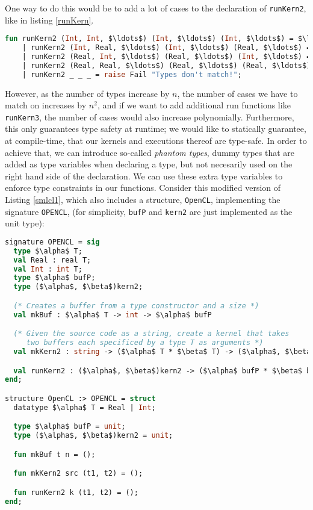 One way to do this would be to add a lot of cases to the declaration
of \texttt{runKern2}, like in listing \ref{runKern}.

\begin{lstlisting}[language=ML, caption=Casing on runKern2,
    label=runKern,mathescape]
  fun runKern2 (Int, Int, $\ldots$) (Int, $\ldots$) (Int, $\ldots$) = $\ldots$
    | runKern2 (Int, Real, $\ldots$) (Int, $\ldots$) (Real, $\ldots$) = $\ldots$
    | runKern2 (Real, Int, $\ldots$) (Real, $\ldots$) (Int, $\ldots$) = $\ldots$
    | runKern2 (Real, Real, $\ldots$) (Real, $\ldots$) (Real, $\ldots$) = $\ldots$
    | runKern2 _ _ _ = raise Fail "Types don't match!";
\end{lstlisting}

However, as the number of types increase by $n$, the number of cases
we have to match on increases by $n^2$, and if we want to add
additional run functions like \texttt{runKern3}, the number of cases
would also increase polynomially. Furthermore, this only guarantees
type safety at runtime; we would like to statically guarantee, at
compile-time, that our kernels and executions thereof are
type-safe. In order to achieve that, we can introduce so-called
\emph{phantom types}, dummy types that are added as type variables
when declaring a type, but not necesarily used on the right hand side
of the declaration. We can use these extra type variables to enforce
type constraints in our functions. Consider this modified version of
Listing \ref{smlcl1}, which also includes a structure,
\texttt{OpenCL}, implementing the signature \texttt{OPENCL}, (for
simplicity, \texttt{bufP} and \texttt{kern2} are just implemented as
the unit type):

\begin{lstlisting}[language=ML, caption=Adding type
    variables,label=smlcl2,mathescape]
signature OPENCL = sig
  type $\alpha$ T;
  val Real : real T;
  val Int : int T;
  type $\alpha$ bufP;
  type ($\alpha$, $\beta$)kern2;

  (* Creates a buffer from a type constructor and a size *)
  val mkBuf : $\alpha$ T -> int -> $\alpha$ bufP

  (* Given the source code as a string, create a kernel that takes
     two buffers each specificed by a type T as arguments *)
  val mkKern2 : string -> ($\alpha$ T * $\beta$ T) -> ($\alpha$, $\beta$)kern2

  val runKern2 : ($\alpha$, $\beta$)kern2 -> ($\alpha$ bufP * $\beta$ bufP) -> unit
end;

structure OpenCL :> OPENCL = struct
  datatype $\alpha$ T = Real | Int;

  type $\alpha$ bufP = unit;
  type ($\alpha$, $\beta$)kern2 = unit;

  fun mkBuf t n = ();

  fun mkKern2 src (t1, t2) = ();

  fun runKern2 k (t1, t2) = ();
end;
\end{lstlisting}

